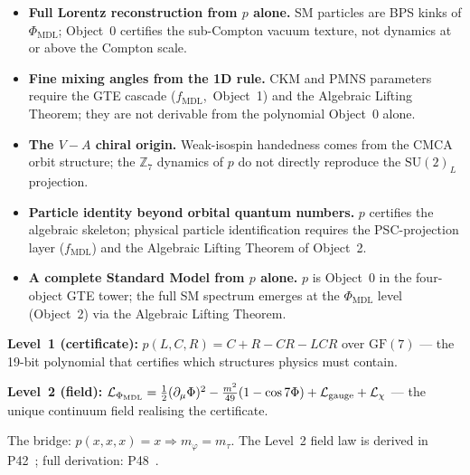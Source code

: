 \documentclass[11pt]{article}
\theoremstyle{remark}
\newcommand{\PHIMDL}{\ensuremath{\Phi_{\mathrm{MDL}}}}
\newcommand{\fmdl}{\ensuremath{f_{\mathrm{MDL}}}}
\begin{document}
\medskip
\begin{tcolorbox}[colback=blue!3,colframe=blue!40!black,
  title={\textbf{What this paper does not claim}},
  fonttitle=\bfseries,left=6pt,right=6pt,top=5pt,bottom=5pt]
\small
\begin{itemize}[noitemsep,topsep=2pt,leftmargin=1.4em]
  \item \textbf{Full Lorentz reconstruction from $p$ alone.}
        SM particles are BPS kinks of $\PHIMDL{}$; Object~0 certifies the
        sub-Compton vacuum texture, not dynamics at or above the Compton scale.
  \item \textbf{Fine mixing angles from the 1D rule.}
        CKM and PMNS parameters require the GTE cascade \mbox{($\fmdl{}$,
        Object~1)} and the Algebraic Lifting Theorem; they are not derivable
        from the polynomial Object~0 alone.
  \item \textbf{The $V\!-\!A$ chiral origin.}
        Weak-isospin handedness comes from the CMCA orbit structure; the
        $\mathbb{Z}_7$ dynamics of $p$ do not directly reproduce the
        $\mathrm{SU}(2)_L$ projection.
  \item \textbf{Particle identity beyond orbital quantum numbers.}
        $p$ certifies the algebraic skeleton; physical particle identification
        requires the PSC-projection layer ($\fmdl{}$) and the
        Algebraic Lifting Theorem of Object~2.
  \item \textbf{A complete Standard Model from $p$ alone.}
        $p$ is Object~0 in the four-object GTE tower; the full SM spectrum
        emerges at the $\PHIMDL{}$ level \mbox{(Object~2)} via the Algebraic
        Lifting Theorem.
\end{itemize}
\end{tcolorbox}

\medskip
\begin{tcolorbox}[colback=green!4,colframe=green!55!black,
  title={\textbf{The Two Levels of the Framework}},
  fonttitle=\small\bfseries, left=6pt, right=6pt, top=4pt, bottom=4pt]
\small

\medskip\noindent
\textbf{Level~1 (certificate):} $p(L,C,R) = C+R-CR-LCR$ over $\mathrm{GF}(7)$
--- the 19-bit polynomial that certifies which structures physics must contain.

\medskip\noindent
\textbf{Level~2 (field):} $\mathcal{L}_{\PHIMDL} = \tfrac{1}{2}(\partial_\mu\Phi)^2 - \frac{m^2}{49}(1-\cos 7\Phi) + \mathcal{L}_{\rm gauge} + \mathcal{L}_\chi$
--- the unique continuum field realising the certificate.

\smallskip\noindent
The bridge: $p(x,x,x)=x \Rightarrow m_\varphi = m_\tau$.
The Level~2 field law is derived in P42~\cite{SpivackPhiMDLField}; full derivation: P48~\cite{SpivackGTECompleteFramework}.
\end{tcolorbox}
\end{document}
